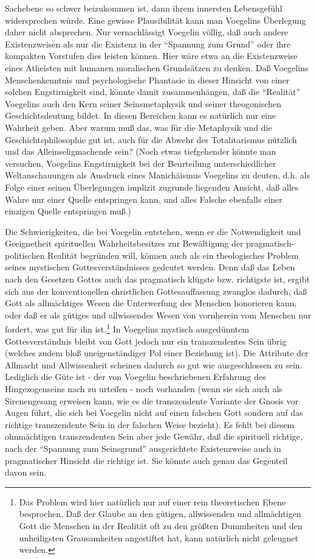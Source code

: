 Sachebene so schwer beizukommen ist, dann ihrem innersten Lebensgefühl
widersprechen würde. Eine gewisse Plausibilität kann man Voegelins
Überlegung daher nicht absprechen. Nur vernachlässigt Voegelin völlig,
daß auch andere Existenzweisen als nur die Existenz in der "`Spannung
zum Grund"' oder ihre kompakten Vorstufen dies leisten können. Hier wäre
etwa an die Existenzweise eines Atheisten mit humanen moralischen
Grundsätzen zu denken. Daß Voegelins Menschenkenntnis und psychologische
Phantasie in dieser Hinsicht von einer solchen Engstirnigkeit sind,
könnte damit zusammenhängen, daß die "`Realität"' Voegelins auch den
Kern seiner Seinsmetaphysik und seiner theogonischen Geschichtsdeutung
bildet. In diesen Bereichen kann es natürlich nur eine Wahrheit geben.
Aber warum muß das, was für die Metaphysik und die Geschichtsphilosophie
gut ist, auch für die Abwehr des Totalitarismus nützlich und das
Alleinseligmachende sein? (Noch etwas tiefgehender könnte man versuchen,
Voegelins Engstirnigkeit bei der Beurteilung unterschiedlicher
Weltanschauungen als Ausdruck eines Manichäismus Voegelins zu deuten,
d.h. als Folge einer seinen Überlegungen implizit zugrunde liegenden
Ansicht, daß alles Wahre nur einer Quelle entspringen kann, und alles
Falsche ebenfalls einer einzigen Quelle entspringen muß.)
 
Die Schwierigkeiten, die bei Voegelin entstehen, wenn er die Notwendigkeit und
Geeignetheit spirituellen Wahrheitsbesitzes zur Bewältigung der
pragmatisch-politischen Realität begründen will, können auch als ein
theologisches Problem seines mystischen Gottesverständnisses gedeutet werden.
Denn daß das Leben nach den Gesetzen Gottes auch das pragmatisch klügste bzw.
richtigste ist, ergibt sich aus der konventionellen christlichen
Gottesauffassung zwanglos dadurch, daß Gott als allmächtiges Wesen die
Unterwerfung des Menschen honorieren kann, oder daß er als gütiges und
allwissendes Wesen von vornherein vom Menschen nur fordert, was gut für ihn
ist.\footnote{Das Problem wird hier natürlich nur auf einer rein theoretischen
  Ebene besprochen. Daß der Glaube an den gütigen, allwissenden und
  allmächtigen Gott die Menschen in der Realität oft zu den größten Dummheiten
  und den unheiligsten Grausamkeiten angestiftet hat, kann natürlich nicht
  geleugnet werden.} In Voegelins mystisch ausgedünntem Gottesverständnis
bleibt von Gott jedoch nur ein transzendentes Sein übrig (welches zudem bloß
uneigenständiger Pol einer Beziehung ist). Die Attribute der Allmacht und
Allwissenheit scheinen dadurch so gut wie ausgeschlossen zu sein. Lediglich
die Güte ist - der von Voegelin beschriebenen Erfahrung des Hingezogenseins
nach zu urteilen - noch vorhanden (wenn sie sich auch als Sirenengesang
erweisen kann, wie es die transzendente Variante der Gnosis vor Augen führt,
die sich bei Voegelin nicht auf einen falschen Gott sondern auf das richtige
transzendente Sein in der falschen Weise bezieht). Es fehlt bei diesem
ohnmächtigen transzendenten Sein aber jede Gewähr, daß die spirituell
richtige, nach der "`Spannung zum Seinsgrund"' ausgerichtete Existenzweise
auch in pragmatischer Hinsicht die richtige ist. Sie könnte auch genau das
Gegenteil davon sein.

